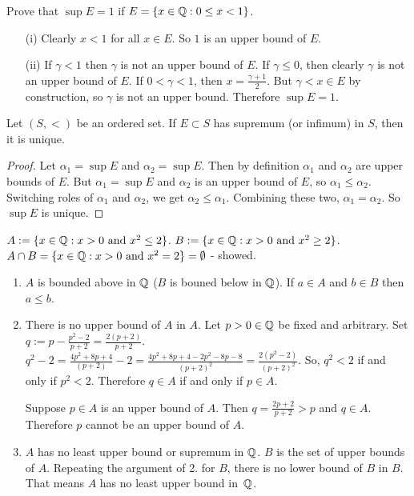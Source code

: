 \documentclass[]{article}
\begin{document}
\begin{example}
	Prove that $\sup E = 1$ if $E = \{x \in \mathbb{Q} : 0 \leq x < 1\}$.
	\begin{enumerate}
		\item[(i)] Clearly $x<1$ for all $x\in E$. So $1$ is an upper bound of $E$.
		\item[(ii)] If $\gamma < 1$ then $\gamma$ is not an upper bound of $E$. If $\gamma \leq 0$, then clearly $\gamma$ is not an upper bound of $E$. If $0<\gamma < 1$, then $x = \frac{\gamma + 1}{2}$. But $\gamma < x\in E$ by construction, so $\gamma$ is not an upper bound. Therefore \ul{$ \sup E = 1$}.
	\end{enumerate}
\end{example}

\begin{theorem}
	 Let $(S,<)$ be an ordered set. If $E\subset S$ has supremum (or infimum) in $S$, then it is unique.
	\begin{proof}
		Let $\alpha_1 = \sup E$ and $\alpha_2 = \sup E$. Then by definition $\alpha_1$ and $\alpha_2$ are upper bounds of $E$. But $\alpha_1 = \sup E$ and $\alpha_2$ is an upper bound of $E$, so $\alpha_1 \leq \alpha_2$. Switching roles of $\alpha_1$ and $\alpha_2$, we get $\alpha_2 \leq \alpha_1$. Combining these two, $\alpha_1 = \alpha_2$. So $\sup E$ is unique.
	\end{proof}
\end{theorem}
\begin{example}
	$A := \{ x\in\mathbb{Q} : x>0 \text{ and } x^2 \leq 2\}$. $B:=\{ x\in\mathbb{Q}: x>0 \text{ and } x^2\geq 2\}$. $A\cap B = \{ x \in\mathbb{Q} : x>0 \text{ and } x^2 = 2\} = \emptyset$ - showed.
	\begin{enumerate}
		\item $A$ is bounded above in $\mathbb{Q}$ ($B$ is bouned below in $\mathbb{Q}$).
		If $a\in A$ and $b\in B$ then $a\leq b$.
		\item There is no upper bound of $A$ in $A$.
		Let $p>0\in \mathbb{Q}$ be fixed and arbitrary. Set $q:= p - \frac{p^2-2}{p+2} = \frac{2(p+2)}{p+2}$. $q^2-2 = \frac{4p^2 + 8p +4}{(p+2)} - 2 = \frac{4p^2 + 8p + 4 - 2p^2 - 8p - 8}{(p+2)^2} = \frac{2(p^2-2)}{(p+2)^2}$. So, $q^2 < 2$ if and only if $p^2 < 2$. Therefore $q\in A$ if and only if $p\in A$.
		
		Suppose $p\in A$ is an upper bound of $A$. Then $q = \frac{2p+2}{p+2} > p$ and $q\in A$. Therefore $p$ cannot be an upper bound of $A$.
		\item $A$ has no least upper bound or supremum in $\mathbb{Q}$.
		$B$ is the set of upper bounds of $A$. Repeating the argument of 2. for $B$, there is no lower bound of $B$ in $B$.
		That means $A$ has no least upper bound in~$\mathbb{Q}$.
	\end{enumerate}
\end{example}
\end{document}
